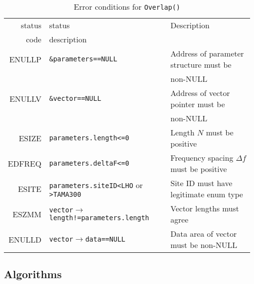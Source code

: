 \documentclass{article}
\begin{document}
\begin{table}
\hskip -0.7in
\begin{tabular}{|r|l|l|}\hline
status&	status&				Description\\
code&	description&			\\\hline
ENULLP&	{\tt \&parameters==NULL\/}&    Address of parameter structure must be\\
& &                                     non-NULL\\
ENULLV&	{\tt \&vector==NULL}&  		Address of vector pointer must be\\
& &                                     non-NULL\\
ESIZE& 	{\tt parameters.length<=0\/}&  	Length $N$ must be positive\\
EDFREQ&	{\tt parameters.deltaF<=0\/}&   Frequency spacing $\Delta f$ must be positive\\
ESITE&	{\tt parameters.siteID<LHO\/} or {\tt >TAMA300\/}& Site ID must have legitimate enum type\\
ESZMM&	{\tt vector$\rightarrow$length!=parameters.length\/}& Vector lengths must agree\\
ENULLD&	{\tt vector$\rightarrow$data==NULL\/}& Data area of vector must be non-NULL\\
\hline
\end{tabular}
\caption{Error conditions for {\tt Overlap()\/}}
\label{t:errors}
\end{table}
                                
\subsection{Algorithms}
\end{document}
